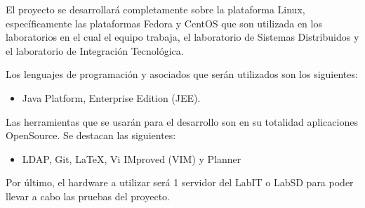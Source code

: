 El proyecto se desarrollará completamente sobre la plataforma Linux,
específicamente las plataformas Fedora y CentOS que son utilizada en los laboratorios en el cual el
equipo trabaja, el laboratorio de Sistemas Distribuidos y el laboratorio de Integración Tecnológica.

Los lenguajes de programación y asociados que serán utilizados son los siguientes:

\begin{itemize}
    \item  Java Platform, Enterprise Edition (JEE).
\end{itemize}

Las herramientas que se usarán para el desarrollo son en su totalidad aplicaciones OpenSource.
Se destacan las siguientes:

\begin{itemize}
    \item LDAP, Git, LaTeX, Vi IMproved (VIM) y Planner
\end{itemize}

Por último, el hardware a utilizar será 1 servidor del LabIT o LabSD para poder llevar a cabo las pruebas
del proyecto.

